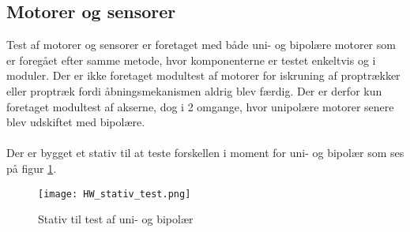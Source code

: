 \subsection{Motorer og sensorer}
Test af motorer og sensorer er foretaget med både uni- og bipolære motorer som er foregået efter samme metode, hvor komponenterne er testet enkeltvis og i moduler. Der er ikke foretaget modultest af motorer for iskruning af proptrækker eller proptræk fordi åbningsmekanismen aldrig blev færdig. Der er derfor kun foretaget modultest af akserne, dog i 2 omgange, hvor unipolære motorer senere blev udskiftet med bipolære.
\\
\\
Der er bygget et stativ til at teste forskellen i moment for uni- og bipolær som ses på figur \ref{fig:HW_stativ_test}.

\begin{figure}[H]
	\centerline{\texttt{[image: HW\_stativ\_test.png]}}
	\caption{Stativ til test af uni- og bipolær}
	\label{fig:HW_stativ_test}
\end{figure}